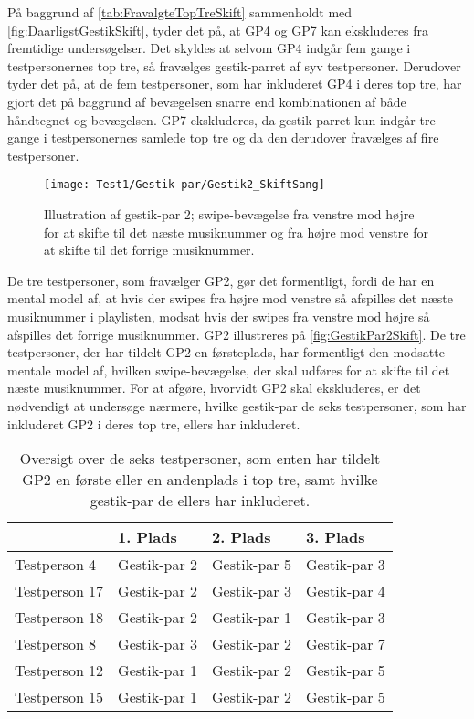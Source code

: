 \noindent
%
På baggrund af \autoref{tab:FravalgteTopTreSkift} sammenholdt med \autoref{fig:DaarligstGestikSkift}, tyder det på, at GP4 og GP7 kan ekskluderes fra fremtidige undersøgelser. Det skyldes at selvom GP4 indgår fem gange i testpersonernes top tre, så fravælges gestik-parret af syv testpersoner. Derudover tyder det på, at de fem testpersoner, som har inkluderet GP4 i deres top tre, har gjort det på baggrund af bevægelsen snarre end kombinationen af både håndtegnet og bevægelsen. GP7 ekskluderes, da gestik-parret kun indgår tre gange i testpersonernes samlede top tre og da den derudover fravælges af fire testpersoner. 
%
\begin{figure}[H]
	\centering
	\texttt{[image: Test1/Gestik-par/Gestik2\_SkiftSang]}
	\caption{Illustration af gestik-par 2; swipe-bevægelse fra venstre mod højre for at skifte til det næste musiknummer og fra højre mod venstre for at skifte til det forrige musiknummer.}
	\label{fig:GestikPar2Skift}
\end{figure}
\noindent
%
De tre testpersoner, som fravælger GP2, gør det formentligt, fordi de har en mental model af, at hvis der swipes fra højre mod venstre så afspilles det næste musiknummer i playlisten, modsat hvis der swipes fra venstre mod højre så afspilles det forrige musiknummer. GP2 illustreres på \autoref{fig:GestikPar2Skift}. De tre testpersoner, der har tildelt GP2 en førsteplads, har formentligt den modsatte mentale model af, hvilken swipe-bevægelse, der skal udføres for at skifte til det næste musiknummer. For at afgøre, hvorvidt GP2 skal ekskluderes, er det nødvendigt at undersøge nærmere, hvilke gestik-par de seks testpersoner, som har inkluderet GP2 i deres top tre, ellers har inkluderet. 
%
\begin{table}[H]
	\centering
	\begin{tabular}{ | p{3cm} | p{3cm} | p{3cm} | p{3cm} |}
	\hline
		 & 1. Plads & 2. Plads & 3. Plads \\ \hline
		Testperson 4 & Gestik-par 2 & Gestik-par 5 & Gestik-par 3 \\ \hline
		Testperson 17 & Gestik-par 2 & Gestik-par 3 & Gestik-par 4 \\ \hline
		Testperson 18 & Gestik-par 2 & Gestik-par 1 & Gestik-par 3 \\ \hline
		Testperson 8 & Gestik-par 3 & Gestik-par 2 & Gestik-par 7 \\ \hline
		Testperson 12 & Gestik-par 1 & Gestik-par 2 & Gestik-par 5\\ \hline
		Testperson 15 & Gestik-par 1 & Gestik-par 2 & Gestik-par 5 \\ \hline
	\end{tabular}
	\caption{Oversigt over de seks testpersoner, som enten har tildelt GP2 en første eller en andenplads i top tre, samt hvilke gestik-par de ellers har inkluderet.}
	\label{tab:GestikPar2ITopTre}
\end{table}
